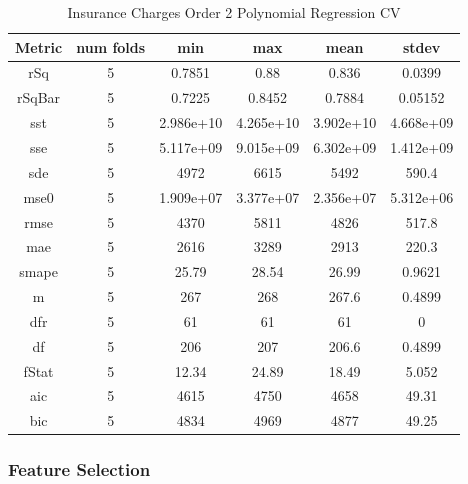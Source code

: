 \documentclass{article}
\begin{document}
\begin{table}[H]
\centering
\caption{Insurance Charges Order 2 Polynomial Regression CV}
\label{tab:Insurance Charges Order 2 Polynomial Regression CV}
\begin{tabular}{|c|c|c|c|c|c|}\hline
Metric & num folds & min & max & mean & stdev \\ \hline \hline
rSq & 5 & 0.7851 & 0.88 & 0.836 & 0.0399 \\ \hline
rSqBar & 5 & 0.7225 & 0.8452 & 0.7884 & 0.05152 \\ \hline
sst & 5 & 2.986e+10 & 4.265e+10 & 3.902e+10 & 4.668e+09 \\ \hline
sse & 5 & 5.117e+09 & 9.015e+09 & 6.302e+09 & 1.412e+09 \\ \hline
sde & 5 & 4972 & 6615 & 5492 & 590.4 \\ \hline
mse0 & 5 & 1.909e+07 & 3.377e+07 & 2.356e+07 & 5.312e+06 \\ \hline
rmse & 5 & 4370 & 5811 & 4826 & 517.8 \\ \hline
mae & 5 & 2616 & 3289 & 2913 & 220.3 \\ \hline
smape & 5 & 25.79 & 28.54 & 26.99 & 0.9621 \\ \hline
m & 5 & 267 & 268 & 267.6 & 0.4899 \\ \hline
dfr & 5 & 61 & 61 & 61 & 0 \\ \hline
df & 5 & 206 & 207 & 206.6 & 0.4899 \\ \hline
fStat & 5 & 12.34 & 24.89 & 18.49 & 5.052 \\ \hline
aic & 5 & 4615 & 4750 & 4658 & 49.31 \\ \hline
bic & 5 & 4834 & 4969 & 4877 & 49.25 \\ \hline
\end{tabular}
\end{table}

\subsubsection{Feature Selection}
\end{document}
